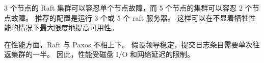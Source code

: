		3 个节点的 Raft 集群可以容忍单个节点故障，而 5 个节点的集群可以容忍 2 个节点故障。 
		推荐的配置是运行 3 个或 5 个 raft 服务器。 这样可以在不显着牺牲性能的情况下最大限度地提高可用性。
		
		在性能方面，Raft 与 Paxos 不相上下。 
		假设领导稳定，提交日志条目需要单次往返集群的一半。 
		因此，性能受磁盘 I/O 和网络延迟的限制。
	
	
	
			
		
	
	\clearpage
	
	
